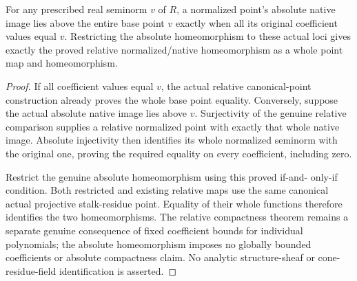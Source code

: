 \begin{theorem}
\label{projective:absolute-native-coefficient-restriction}
\leanok
{}
For any prescribed real seminorm $v$ of $R$, a normalized point's
absolute native image lies above the entire base point $v$ exactly when
all its original coefficient values equal $v$. Restricting the absolute
homeomorphism to these actual loci gives exactly the proved
relative normalized/native homeomorphism as a whole point map and
homeomorphism.
\end{theorem}
\begin{proof}
If all coefficient values equal $v$, the actual relative canonical-point
construction already proves the whole base point equality. Conversely,
suppose the actual absolute native image lies above $v$. Surjectivity
of the genuine relative comparison supplies a relative normalized
point with exactly that whole native image. Absolute injectivity then
identifies its whole normalized seminorm with the original one, proving
the required equality on every coefficient, including zero.

Restrict the genuine absolute homeomorphism using this proved if-and-
only-if condition. Both restricted and existing relative maps use the
same canonical actual projective stalk-residue point. Equality of their
whole functions therefore identifies the two homeomorphisms. The
relative compactness theorem remains a separate genuine consequence of
fixed coefficient bounds for individual polynomials; the absolute
homeomorphism imposes no globally bounded coefficients or absolute
compactness claim. No analytic structure-sheaf or cone-residue-field
identification is asserted.
\end{proof}
